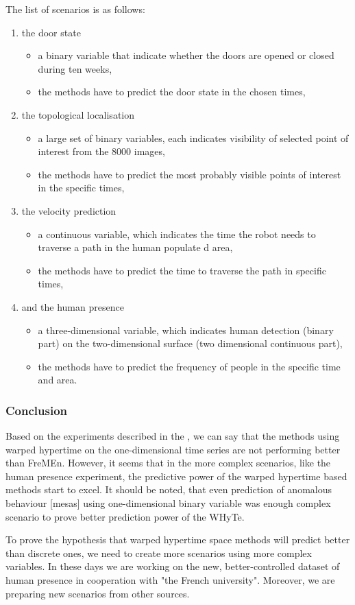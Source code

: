 The list of scenarios is as follows:
\begin{enumerate}
    \item the door state
    \begin{itemize}
        \item a binary variable that indicate whether the doors are opened or closed during ten weeks,
        \item the methods have to predict the door state in the chosen times,
    \end{itemize}
    \item the topological localisation
    \begin{itemize}
        \item a large set of binary variables, each indicates visibility of selected point of interest from the $8000$ images,
        \item the methods have to predict the most probably visible points of interest in the specific times,
    \end{itemize}
    \item the velocity prediction
    \begin{itemize}
        \item a continuous variable, which indicates the time the robot needs to traverse a path in the human populate
d area,
        \item the methods have to predict the time to traverse the path in specific times,
    \end{itemize}
    \item and the human presence
    \begin{itemize}
        \item a three-dimensional variable, which indicates human detection (binary part) on the two-dimensional surface (two dimensional continuous part),
        \item the methods have to predict the frequency of people in the specific time and area.
    \end{itemize}
\end{enumerate}

\subsubsection{Conclusion}

Based on the experiments described in the \cite{krajnik2018warped}, we can say that the methods using warped hypertime on the one-dimensional time series are not performing better than FreMEn.
However, it seems that in the more complex scenarios, like the human presence experiment, the predictive power of the warped hypertime based methods start to excel.
It should be noted, that even prediction of anomalous behaviour [mesas] using one-dimensional binary variable was
enough complex scenario to prove better prediction power of the WHyTe.

To prove the hypothesis that warped hypertime space methods will predict better than discrete ones, we need to create more scenarios using more complex variables.
In these days we are working on the new, better-controlled dataset of human presence in cooperation with "the French university".
Moreover, we are preparing new scenarios from other sources.
